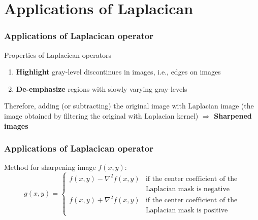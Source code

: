 \documentclass[english,11pt,table,handout]{beamer}
\begin{document}
\section{Applications of Laplacican}
\frame
{
	\frametitle{Applications of Laplacican operator}
	\begin{alertblock}{Properties of Laplacican operators}
		\begin{enumerate}
			\item \textbf{Highlight} gray-level discontinues in images, i.e., edges on images
			\item \textbf{De-emphasize} regions with slowly varying gray-levels
		\end{enumerate}
		
		Therefore, adding (or subtracting) the original image with Laplacian image (the image obtained by filtering the original with Laplacian kernel) $\Rightarrow$ \alert{\textbf{Sharpened images}}
	\end{alertblock}
	
}
\frame
{
	\frametitle{Applications of Laplacican operator}
	Method for sharpening  image $f(x,y)$:
	\flushleft
	$$
	g(x,y) =
	\begin{cases}
		f(x,y) - \nabla^2f(x,y)& 	\text{if the center coefficient of the}\\
			& \text{Laplacian mask is negative }\\
		f(x,y) + \nabla^2f(x,y)& 	\text{if the center coefficient of the} \\
		&  \text{Laplacian mask is positive }
	\end{cases}
	$$
	
}
\frame
\end{document}
